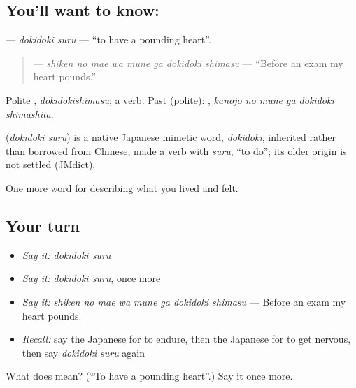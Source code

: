 \subsection*{You'll want to know: }
\textbf{} — \emph{dokidoki suru} — \textquotedblleft{}to have a pounding heart\textquotedblright{}.

\begin{quote}
\textbf{   } — \emph{shiken no mae wa mune ga dokidoki shimasu} — \textquotedblleft{}Before an exam my heart pounds.\textquotedblright{}
\end{quote}

Polite \textbf{}, \emph{dokidokishimasu}; a  verb. Past (polite): \textbf{  }, \emph{kanojo no mune ga dokidoki shimashita}.

\begin{cousinweb}
\textbf{} (\emph{dokidoki suru}) is a native Japanese mimetic word, \emph{dokidoki}, inherited rather than borrowed from Chinese, made a verb with \emph{suru}, \textquotedblleft{}to do\textquotedblright{}; its older origin is not settled (JMdict).
\end{cousinweb}

\begin{grammarlens}[title={What you've built}]
One more word for describing what you lived and felt.
\end{grammarlens}

\subsection*{Your turn}
\begin{itemize}
\raggedright
  \item \emph{Say it:} \emph{dokidoki suru}
  \item \emph{Say it:} \emph{dokidoki suru}, once more
  \item \emph{Say it:} \emph{shiken no mae wa mune ga dokidoki shimasu} — Before an exam my heart pounds.
  \item \emph{Recall:} say the Japanese for to endure, then the Japanese for to get nervous, then say \emph{dokidoki suru} again
\end{itemize}

\begin{tcolorbox}[breakable,colback=teal!4,colframe=teal!35!black,title={Before you move on}]
What does  mean? (\textquotedblleft{}To have a pounding heart\textquotedblright{}.) Say it once more.
\end{tcolorbox}
